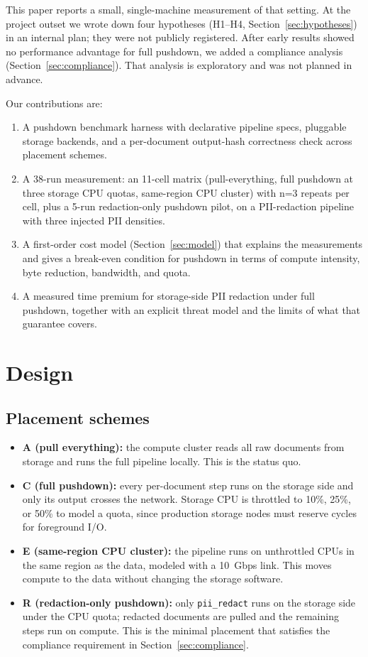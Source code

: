 \documentclass[11pt]{article}
\begin{document}
This paper reports a small, single-machine measurement of that setting. At the project outset we wrote down four hypotheses (H1--H4, Section~\ref{sec:hypotheses}) in an internal plan; they were not publicly registered. After early results showed no performance advantage for full pushdown, we added a compliance analysis (Section~\ref{sec:compliance}). That analysis is exploratory and was not planned in advance.

Our contributions are:
\begin{enumerate}
\item A pushdown benchmark harness with declarative pipeline specs, pluggable storage backends, and a per-document output-hash correctness check across placement schemes.
\item A 38-run measurement: an 11-cell matrix (pull-everything, full pushdown at three storage CPU quotas, same-region CPU cluster) with n=3 repeats per cell, plus a 5-run redaction-only pushdown pilot, on a PII-redaction pipeline with three injected PII densities.
\item A first-order cost model (Section~\ref{sec:model}) that explains the measurements and gives a break-even condition for pushdown in terms of compute intensity, byte reduction, bandwidth, and quota.
\item A measured time premium for storage-side PII redaction under full pushdown, together with an explicit threat model and the limits of what that guarantee covers.
\end{enumerate}

\section{Design}

\subsection{Placement schemes}

\begin{itemize}
\item \textbf{A (pull everything):} the compute cluster reads all raw documents from storage and runs the full pipeline locally. This is the status quo.
\item \textbf{C (full pushdown):} every per-document step runs on the storage side and only its output crosses the network. Storage CPU is throttled to 10\%, 25\%, or 50\% to model a quota, since production storage nodes must reserve cycles for foreground I/O.
\item \textbf{E (same-region CPU cluster):} the pipeline runs on unthrottled CPUs in the same region as the data, modeled with a 10~Gbps link. This moves compute to the data without changing the storage software.
\item \textbf{R (redaction-only pushdown):} only \texttt{pii\_redact} runs on the storage side under the CPU quota; redacted documents are pulled and the remaining steps run on compute. This is the minimal placement that satisfies the compliance requirement in Section~\ref{sec:compliance}.
\end{itemize}
\end{document}
